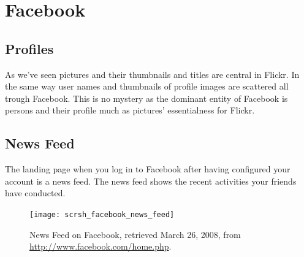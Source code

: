 \section{Facebook}
\label{section:analysis.facebook}

\subsection{Profiles}

As we've seen pictures and their thumbnails and titles are central in Flickr.
In the same way user names and thumbnails of profile images are scattered all
trough Facebook. This is no mystery as the dominant entity of Facebook is
persons and their profile much as pictures' essentialness for Flickr.

\subsection{News Feed}

The landing page when you log in to Facebook after having configured your
account is a news feed. The news feed shows the recent activities your friends
have conducted.


\begin{figure}
  \texttt{[image: scrsh\_facebook\_news\_feed]}
  \caption[Facebook News Feed]{%
     News Feed on Facebook,
     retrieved March 26, 2008, from \url{http://www.facebook.com/home.php}.}
  \label{figure:scrsh.facebook.news.feed}
\end{figure}



